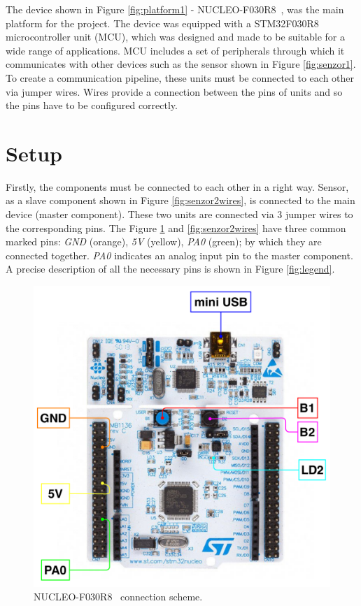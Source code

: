 \documentclass[11pt,a4paper]{article}
\begin{document}
\indent The device shown in Figure \ref{fig:platform1} - NUCLEO-F030R8~\cite{PLATFORM}, was the main platform for the project. The device was equipped with a STM32F030R8~\cite{MCU} microcontroller unit (MCU), which was designed and made to be suitable for a wide range of applications. MCU includes a set of peripherals through which it communicates with other devices such as the sensor shown in Figure \ref{fig:senzor1}. To create a communication pipeline, these units must be connected to each other via jumper wires. Wires provide a connection between the pins of units and so the pins have to be configured correctly.

\newpage %

\section{Setup}

Firstly, the components must be connected to each other in a right way. Sensor, as a slave component shown in Figure \ref{fig:senzor2wires}, is connected to the main device (master component). These two units are connected via 3 jumper wires to the corresponding pins. The Figure \ref{fig:device2wires} and \ref{fig:senzor2wires} have three common marked pins: \textit{GND} (orange), \textit{5V} (yellow), \textit{PA0} (green); by which they are connected together. \textit{PA0} indicates an analog input pin to the master component. A precise description of all the necessary pins is shown in Figure \ref{fig:legend}.

\begin{figure}[H]
    \centering
    \includegraphics[scale=0.5]{img/device2-wires.pdf}
    \caption{NUCLEO-F030R8~\cite{IMG-DEVICE-2} connection scheme.}
    \label{fig:device2wires}
\end{figure}
\end{document}
